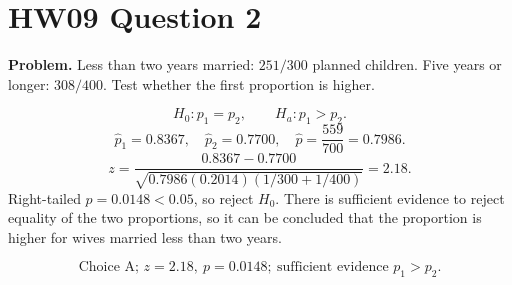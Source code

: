 \documentclass[11pt]{article}
\begin{document}
\section*{HW09 Question 2}

\textbf{Problem.} Less than two years married: \(251/300\) planned children. Five years or longer: \(308/400\). Test whether the first proportion is higher.

\[
H_0:p_1=p_2,\qquad H_a:p_1>p_2.
\]
\[
\hat p_1=0.8367,\quad \hat p_2=0.7700,\quad \hat p=\frac{559}{700}=0.7986.
\]
\[
z=\frac{0.8367-0.7700}{\sqrt{0.7986(0.2014)(1/300+1/400)}}=2.18.
\]
Right-tailed \(p=0.0148<0.05\), so reject \(H_0\). There is sufficient evidence to reject equality of the two proportions, so it can be concluded that the proportion is higher for wives married less than two years.

\[
\boxed{\text{Choice A; }z=2.18,\ p=0.0148;\ \text{sufficient evidence }p_1>p_2.}
\]
\end{document}
